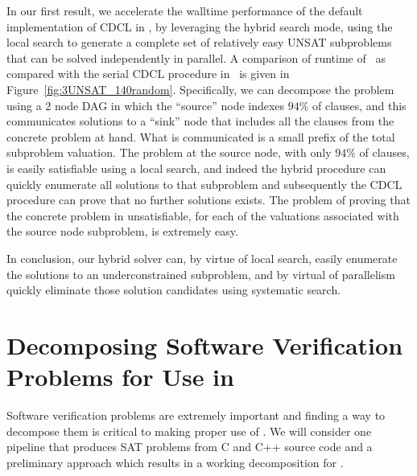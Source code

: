 \documentclass[
10pt, %
a4paper, %
oneside, %
headinclude,footinclude, %
BCOR5mm, %
]{scrartcl}
\begin{document}
In our first result, we accelerate the walltime performance of the default implementation of CDCL in \tinisat, by leveraging the hybrid search mode, using the local search to generate a complete set of relatively easy UNSAT subproblems that can be solved independently in parallel.
A comparison of runtime of \dagster\ as compared with the serial CDCL procedure in \tinisat\ is given in Figure~\ref{fig:3UNSAT_140random}. 
Specifically, we can decompose the problem using a 2 node DAG in which the ``source'' node indexes $94\%$ of clauses, and this communicates solutions to a ``sink'' node that includes all the clauses from the concrete problem at hand.
What is communicated is a small prefix of the total subproblem valuation. 
The problem at the source node, with only  $94\%$ of clauses, is easily satisfiable using a local search, and indeed the hybrid procedure can quickly enumerate all solutions to that subproblem and subsequently the CDCL procedure can prove that no further solutions exists.
The problem of proving that the concrete problem in unsatisfiable, for each of the valuations associated with the source node subproblem, is extremely easy.

%



In conclusion, our hybrid solver can, by virtue of local search, easily enumerate the solutions to an underconstrained subproblem, and by virtual of parallelism quickly eliminate those solution candidates using systematic search. 

\clearpage
\section{Decomposing Software Verification Problems for Use in \dagster}

Software verification problems are extremely important and finding a way to decompose them is critical to making proper use of \dagster. We will consider one pipeline that produces SAT problems from C and C++ source code and a preliminary approach which results in a working decomposition for \dagster.
\end{document}

